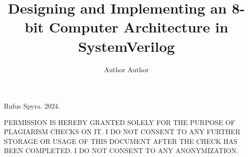 \documentclass[parskip=full]{scrreprt}
\title{Designing and Implementing an 8-bit Computer Architecture in SystemVerilog}
\author{Author Author}
\date{}
\begin{document}
\maketitle
\textcopyright Rufus Spyra. 2024.

PERMISSION IS HEREBY GRANTED SOLELY FOR THE PURPOSE OF PLAGIARISM CHECKS ON IT. I DO NOT CONSENT TO ANY FURTHER STORAGE OR USAGE OF THIS DOCUMENT AFTER THE CHECK HAS BEEN COMPLETED. I DO NOT CONSENT TO ANY ANONYMIZATION.
\tableofcontents






\
\listoffigures
\listoftables
\lstlistoflistings
\printbibliography
\end{document}
